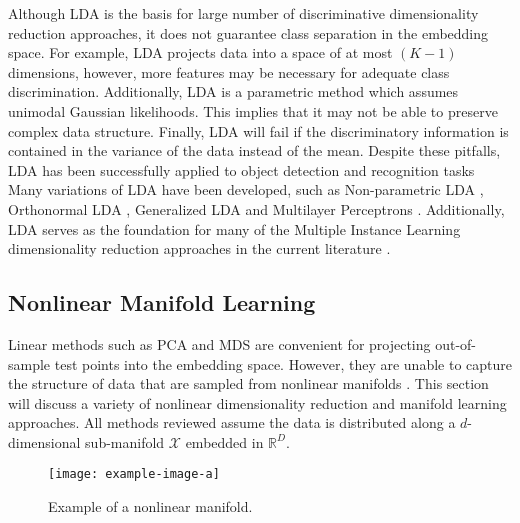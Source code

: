 Although LDA is the basis for large number of discriminative dimensionality reduction approaches, it does not guarantee class separation in the embedding space.  For example, LDA projects data into a space of at most $(K-1)$ dimensions, however, more features may be necessary for adequate class discrimination.  Additionally, LDA is a parametric method which assumes unimodal Gaussian likelihoods.  This implies that it may not be able to preserve complex data structure.  Finally, LDA will fail if the discriminatory information is contained in the variance of the data instead of the mean.  Despite these pitfalls, LDA  has been successfully applied to object detection and recognition tasks \citep{Wang2016OrthogonalLDA}  Many variations of LDA have been developed, such as Non-parametric LDA \citep{Fukunaga1983NonparametricLDA}, Orthonormal LDA \citep{Wang2016OrthogonalLDA}, Generalized LDA \citep{Baudat2000GeneralizedDiscriminantAnalysis} and Multilayer Perceptrons \citep{Webb1990MLPLDA}.  Additionally, LDA serves as the foundation for many of the Multiple Instance Learning dimensionality reduction approaches in the current literature \citep{Sun2010MIDR,Chai2014MIDA,Zhu2018MIDRSparsity}.

\subsection{Nonlinear Manifold Learning}

Linear methods such as PCA and MDS are convenient for projecting out-of-sample test points into the embedding space.  However, they are unable to capture the structure of data that are sampled from nonlinear manifolds \citep{Kegl2008PrincipalManifoldsTextbook}. This section will discuss a variety of nonlinear dimensionality reduction and manifold learning approaches.  All methods reviewed assume the data is distributed along a $d$-dimensional sub-manifold $\mathcal{X}$ embedded in $\mathbb{R}^{D}$.

\begin{center}
	\begin{figure*}[h]
		\centering
		\texttt{[image: example-image-a]}
		\caption[Example of a nonlinear manifold.]{Example of a nonlinear manifold.}
		\label{fig:nonlinear_manifold}
	\end{figure*}
\end{center}


